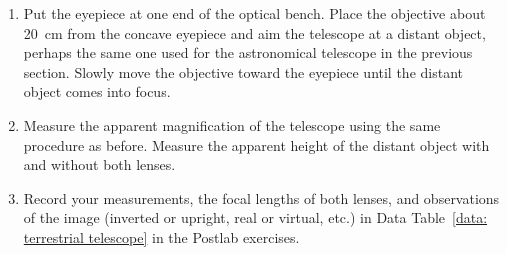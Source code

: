 \documentclass[addpoints]{physlabs}
\begin{document}
\begin{labsection}
\begin{enumerate}
        \item Put the eyepiece at one end of the optical bench. Place the objective about \qty{20}{\centi\meter} from the concave eyepiece and aim the telescope at a distant object, perhaps the same one used for the astronomical telescope in the previous section. Slowly move the objective toward the eyepiece until the distant object comes into focus.
        
        \item Measure the apparent magnification of the telescope using the same procedure as before. Measure the apparent height of the distant object with and without both lenses.
        
        \item Record your measurements, the focal lengths of both lenses, and observations of the image (inverted or upright, real or virtual, etc.) in Data Table~\ref{data: terrestrial telescope} in the Postlab exercises. 
    \end{enumerate}
    
\end{labsection}
\end{document}
